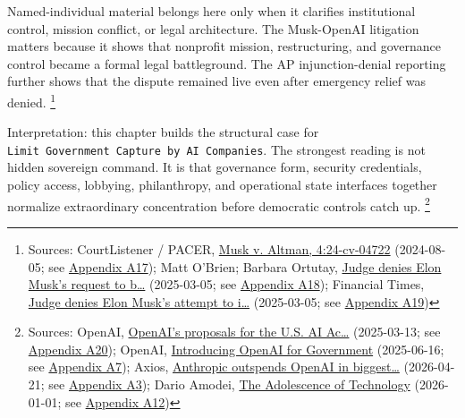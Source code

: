 \documentclass[
  american,
  11pt,
  letterpaper,
]{article}
\begin{document}
Named-individual material belongs here only when it clarifies
institutional control, mission conflict, or legal architecture. The
Musk-OpenAI litigation matters because it shows that nonprofit mission,
restructuring, and governance control became a formal legal
battleground. The AP injunction-denial reporting further shows that the
dispute remained live even after emergency relief was denied.
\footnote{Sources: CourtListener / PACER,
  \href{https://www.courtlistener.com/docket/69013420/musk-v-altman/}{Musk
  v. Altman, 4:24-cv-04722} (2024-08-05; see
  \hyperref[ch-08-appendix-a17-musk-v-altman-4-24-cv-04722]{Appendix
  A17}); Matt O'Brien; Barbara Ortutay,
  \href{https://apnews.com/article/elon-musk-openai-lawsuit-f5724e7ab07b5bed8292a1e8aa2ef695}{Judge
  denies Elon Musk's request to b\ldots{}} (2025-03-05; see
  \hyperref[ch-08-appendix-a18-judge-denies-elon-musk-s-request-to-block-openai-for-profit-conversion-but-welcomes-trial]{Appendix
  A18}); Financial Times,
  \href{https://www.ft.com/content/532931dd-e1c0-4f18-a8af-5777dd70a52d}{Judge
  denies Elon Musk's attempt to i\ldots{}} (2025-03-05; see
  \hyperref[ch-08-appendix-a19-judge-denies-elon-musks-attempt-to-immediately-block-openais-conversion-to-for-profit-entity]{Appendix
  A19})}

Interpretation: this chapter builds the structural case for
\texttt{Limit\ Government\ Capture\ by\ AI\ Companies}. The strongest
reading is not hidden sovereign command. It is that governance form,
security credentials, policy access, lobbying, philanthropy, and
operational state interfaces together normalize extraordinary
concentration before democratic controls catch up. \footnote{Sources:
  OpenAI,
  \href{https://openai.com/global-affairs/openai-proposals-for-the-us-ai-action-plan/}{OpenAI's
  proposals for the U.S. AI Ac\ldots{}} (2025-03-13; see
  \hyperref[ch-08-appendix-a20-openais-proposals-for-the-us-ai-action-plan]{Appendix
  A20}); OpenAI,
  \href{https://openai.com/global-affairs/introducing-openai-for-government/}{Introducing
  OpenAI for Government} (2025-06-16; see
  \hyperref[ch-08-appendix-a7-introducing-openai-for-government]{Appendix
  A7}); Axios,
  \href{https://www.axios.com/2026/04/21/anthropic-outspends-openai-biggest-lobbying-quarter}{Anthropic
  outspends OpenAI in biggest\ldots{}} (2026-04-21; see
  \hyperref[ch-08-appendix-a3-anthropic-outspends-openai-in-biggest-ever-lobbying-quarter]{Appendix
  A3}); Dario Amodei,
  \href{https://darioamodei.com/essay/the-adolescence-of-technology}{The
  Adolescence of Technology} (2026-01-01; see
  \hyperref[ch-08-appendix-a12-the-adolescence-of-technology]{Appendix
  A12})}
\end{document}
